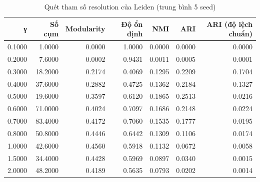 \begin{table}[htbp]
\caption{Quét tham số resolution của Leiden (trung bình 5 seed)}
\label{tab:rq2_sweep}
\begin{tabular}{rrrrrrr}
\toprule
γ & Số cụm & Modularity & Độ ổn định & NMI & ARI & ARI (độ lệch chuẩn) \\
\midrule
0.1000 & 1.0000 & 0.0000 & 1.0000 & 0.0000 & 0.0000 & 0.0000 \\
0.2000 & 7.6000 & 0.0002 & 0.9431 & 0.0011 & 0.0005 & 0.0001 \\
0.3000 & 18.2000 & 0.2174 & 0.4069 & 0.1295 & 0.2209 & 0.1704 \\
0.4000 & 37.6000 & 0.2882 & 0.4725 & 0.1362 & 0.2184 & 0.1327 \\
0.5000 & 19.6000 & 0.3597 & 0.6120 & 0.1865 & 0.2513 & 0.0216 \\
0.6000 & 71.0000 & 0.4024 & 0.7097 & 0.1686 & 0.2148 & 0.0224 \\
0.7000 & 83.4000 & 0.4172 & 0.7060 & 0.1535 & 0.1777 & 0.0195 \\
0.8000 & 50.8000 & 0.4446 & 0.6442 & 0.1309 & 0.1106 & 0.0174 \\
1.0000 & 42.6000 & 0.4560 & 0.5918 & 0.1132 & 0.0672 & 0.0058 \\
1.5000 & 34.4000 & 0.4428 & 0.5969 & 0.0897 & 0.0340 & 0.0015 \\
2.0000 & 48.2000 & 0.4189 & 0.5635 & 0.0793 & 0.0202 & 0.0014 \\
\bottomrule
\end{tabular}
\end{table}
